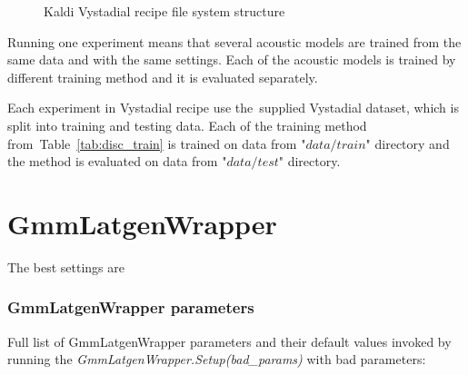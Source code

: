 {\begin{figure}[!htp]
\centering \theverbbox \caption{\small{Kaldi Vystadial recipe file system structure}}
\label{fig:s5_dir}
\end{figure}

Running one experiment means that several acoustic models are trained from the same data and with the same settings. 
Each of the acoustic models is trained by different training method and it is evaluated separately.

Each experiment in Vystadial recipe use the~supplied Vystadial dataset, which is split into training and testing data.
Each of the training method from~Table~\ref{tab:disc_train} is trained on data from "$data/train$" directory
and the method is evaluated on data from "$data/test$" directory.


\section{GmmLatgenWrapper}}
\label{sec:gmmlatgenwrapper}
The best settings are 

\subsubsection*{GmmLatgenWrapper parameters}
Full list of GmmLatgenWrapper parameters and their default values invoked by running
the {\it GmmLatgenWrapper.Setup(bad\_params)}\/ with bad parameters:







